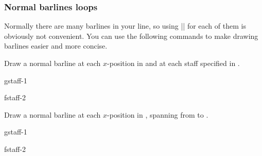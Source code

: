 \subsubsection{Normal barlines loops}\label{sec:multistaff:barlines:normal-loop}
Normally there are many barlines in your line, so using |\tmbarline| for 
each of them is obviously not convenient. You can use the following commands 
to make drawing barlines easier and more concise.
\begin{command}{\tmbarlineloop{}}
  Draw a normal barline at each $x$-position in  and at each 
  staff specified in .
\end{command}
\begin{codeexample}[]
\begin{tmline}%
  \begin{tmstaff}{g}{staff-1}\end{tmstaff}%
  \begin{tmstaff}{f}{staff-2}\end{tmstaff}%
\end{tmline}
\end{codeexample}
\begin{command}{\tmbarlineloop*{}}
  Draw a normal barline at each $x$-position in , spanning 
  from  to .
\end{command}
\begin{codeexample}[]
\begin{tmline}%
\begin{tmstaff}{g}{staff-1}\end{tmstaff}%
\begin{tmstaff}{f}{staff-2}\end{tmstaff}%
%
\end{tmline}
\end{codeexample}
